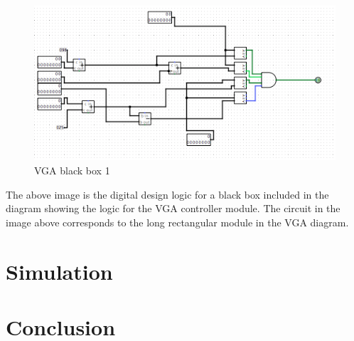 \documentclass{article}
\begin{document}
\begin{figure}[H]
	\begin{center}
		\includegraphics[width=1\textwidth]{vgaBlackBox} 
		\caption{VGA black box 1}
	\end{center}
\end{figure}

The above image is the digital design logic for a black box included in the diagram showing the logic for the VGA controller module.  The circuit in the image above corresponds to the long rectangular module in the VGA diagram.



\section*{Simulation}



\section*{Conclusion}




%

%

\end{document}
